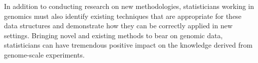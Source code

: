 \documentclass{amsart}
\begin{document}
In addition to conducting research on new methodologies, statisticians
working in genomics must also identify existing techniques that are
appropriate for these data structures and demonstrate how they can be
correctly applied in new settings.  Bringing novel and existing
methods to bear on genomic data, statisticians can have tremendous
positive impact on the knowledge derived from genome-scale
experiments.
\end{document}
